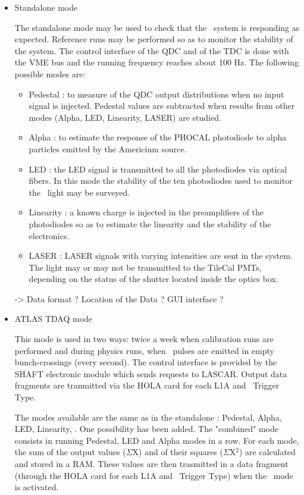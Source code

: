 \begin{itemize}

\item Standalone mode

The standalone mode may be used to check that the \laser~system is responding as expected. Reference runs may be performed so as to monitor the stability of the system. The control interface of the QDC and of the TDC is done with the VME bus and the running frequency reaches about 100 Hz. The following possible modes are:
\begin{itemize}

\item Pedestal : to measure of the QDC output distributions when no input signal is injected. Pedestal values are subtracted when results from other modes (Alpha, LED, Linearity, LASER) are studied.

\item Alpha : to estimate the response of the PHOCAL photodiode to alpha particles emitted by the Americium source. 

\item LED : the LED signal is transmitted to all the photodiodes via optical fibers. In this mode  the stability of the ten photodiodes used to monitor the \laser~light may be surveyed.

\item Linearity : a known charge is injected in the preamplifiers of the photodiodes so as to estimate the linearity and the stability of the electronics. 

\item LASER : LASER signals with varying intensities are sent in the system. The light may or may not be transmitted to the TileCal PMTs, depending on the status of the shutter located inside the optics box.

\end{itemize}

-> Data format ? Location of the Data ? GUI interface ?

\item ATLAS TDAQ mode

This mode is used in two ways: twice a week when calibration runs are performed and during physics runs, when \laser~pulses are emitted in empty bunch-crossings (every second). The control interface is provided by the SHAFT electronic module which sends requests to LASCAR. Output data fragments are tranmitted via the HOLA card for each L1A and \laser~Trigger Type.

The modes available are the same as in the standalone : Pedestal, Alpha, LED, Linearity, \laser. One possibility has been added. The "combined" mode consists in running Pedestal, LED and Alpha modes in a row. For each mode, the sum of the output values ($\Sigma$X) and of their squares ($\Sigma$X$^{2}$) are calculated and stored in a RAM. These values are then trasmitted in a data fragment (through the HOLA card for each L1A and \laser~Trigger Type) when the \laser~mode is activated.

\end{itemize}

